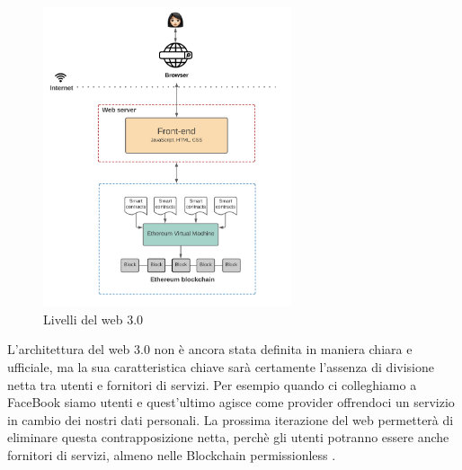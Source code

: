 \begin{figure}[h]
    \caption{Livelli del web 3.0}
    \centering
    \includegraphics[width=0.65\textwidth]{Immagini/web_30.png}
\end{figure}
L'architettura del web 3.0 non è ancora stata definita in maniera chiara e ufficiale, ma la sua caratteristica chiave sarà certamente l'assenza
di divisione netta tra utenti e fornitori di servizi. Per esempio quando ci colleghiamo a FaceBook siamo utenti e quest'ultimo agisce come provider 
offrendoci un servizio in cambio dei nostri dati personali. La prossima iterazione del web permetterà di eliminare questa contrapposizione netta, perchè
gli utenti potranno essere anche fornitori di servizi, almeno nelle Blockchain permissionless \cite{Blockchain_guida_allecosistema}.
